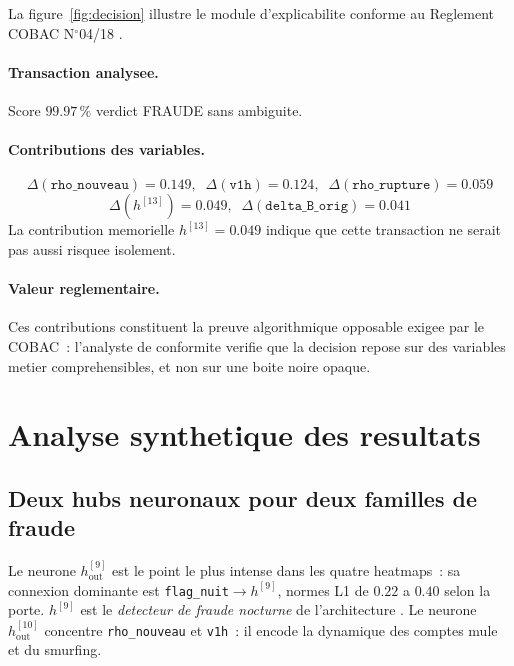 \documentclass[11pt,a4paper,twocolumn]{article}
\begin{document}
La figure~\ref{fig:decision} illustre le module d'explicabilite
conforme au Reglement COBAC N$^{\circ}$04/18 \cite{cobac2018}.

\paragraph{Transaction analysee.}
Score $\mathbf{99.97\,\%}$ \textemdash{} verdict FRAUDE sans ambiguite.

\paragraph{Contributions des variables.}
\[
  \Delta(\texttt{rho\_nouveau}){=}0.149,\;\;
  \Delta(\texttt{v1h}){=}0.124,\;\;
  \Delta(\texttt{rho\_rupture}){=}0.059
\]
\[
  \Delta(h^{[13]}){=}0.049,\;\;
  \Delta(\texttt{delta\_B\_orig}){=}0.041
\]
La contribution memorielle $h^{[13]}=0.049$ indique que cette
transaction ne serait pas aussi risquee isolement.

\paragraph{Valeur reglementaire.}
Ces contributions constituent la preuve algorithmique opposable
exigee par le COBAC~: l'analyste de conformite verifie que la
decision repose sur des variables metier comprehensibles, et non
sur une boite noire opaque.

\section{Analyse synthetique des resultats}
\label{sec:synthese}

\subsection{Deux hubs neuronaux pour deux familles de fraude}

Le neurone $h_{\text{out}}^{[9]}$ est le point le plus intense
dans les quatre heatmaps~: sa connexion dominante est
\texttt{flag\_nuit}$\to h^{[9]}$, normes L1 de $0.22$ a $0.40$
selon la porte. $h^{[9]}$ est le \emph{detecteur de fraude nocturne}
de l'architecture \cite{gsma2023}. Le neurone $h_{\text{out}}^{[10]}$
concentre \texttt{rho\_nouveau} et \texttt{v1h}~: il encode la
dynamique des comptes mule et du smurfing.
\end{document}
